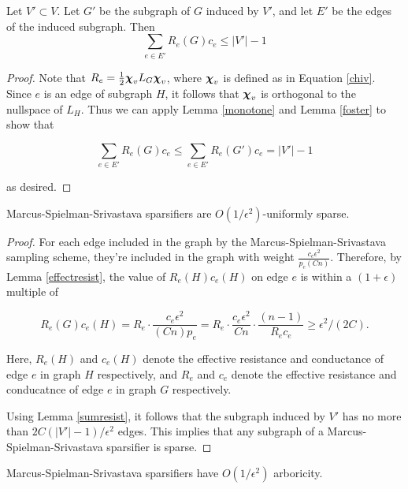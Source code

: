 \begin{lemma} \label{sumresist}
Let $V' \subset V$. Let $G'$ be the subgraph of $G$ induced by $V'$, and let $E'$ be the edges of the induced subgraph. 
Then 
\begin{equation}
\sum_{e \in E'} R_e(G)c_e \leq |V'|-1
\end{equation}
\end{lemma}

\begin{proof} Note that $R_e = \frac{1}{2} \boldsymbol{\chi}_v L_G \boldsymbol{\chi}_v$, where $\boldsymbol{\chi}_v$ is defined as in Equation \ref{chiv}. Since $e$ is an edge of subgraph $H$, it follows that $\boldsymbol{\chi}_v$ is orthogonal to the nullspace of $L_H$. Thus we can apply Lemma \ref{monotone} and Lemma \ref{foster} to show that

\begin{equation}
\sum_{e \in E'} R_e(G)c_e \leq \sum_{e \in E'} R_e(G')c_e =|V'|-1
\end{equation}

as desired.
\end{proof}

\begin{theorem}\label{main}
Marcus-Spielman-Srivastava sparsifiers are $O(1/\epsilon^2)$-uniformly sparse.
\end{theorem}

\begin{proof} 
For each edge included in the graph by the Marcus-Spielman-Srivastava sampling scheme, they're included in the graph with weight $\frac{c_e\epsilon^2}{p_e(Cn)}$.  Therefore, by Lemma \ref{effectresist}, the value of $R_e(H)c_e(H)$ on edge $e$ is within a $(1+\epsilon)$ multiple of

\begin{equation}
R_e(G)c_e(H) = R_e \cdot \frac{c_e \epsilon^2}{(Cn)p_e} = R_e \cdot \frac{c_e\epsilon^2}{Cn} \cdot\frac{(n-1)}{R_ec_e} \geq \epsilon^2/(2C).
\end{equation}

Here, $R_e(H)$ and $c_e(H)$ denote the effective resistance and conductance of edge $e$ in graph $H$ respectively, and $R_e$ and $c_e$ denote the effective resistance and conducatnce of edge $e$ in graph $G$ respectively.

\vspace{2 mm}
Using Lemma \ref{sumresist}, it follows that the subgraph induced by $V'$ has no more than $2C(|V'|-1)/\epsilon^2$ edges. This implies that any subgraph of a Marcus-Spielman-Srivastava sparsifier is sparse.
\end{proof}
\begin{corollary}
Marcus-Spielman-Srivastava sparsifiers have $O(1/\epsilon^2)$ arboricity.
\end{corollary}

